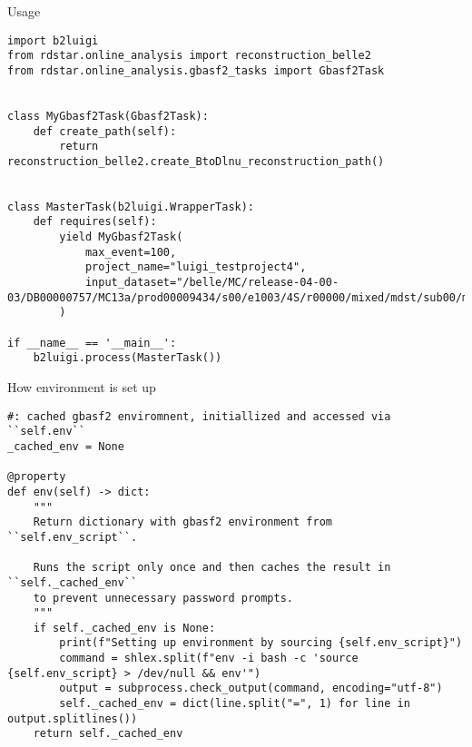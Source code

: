 \documentclass[aspectratio=169, 16pt]{beamer}
\begin{document}
\begin{frame}[label={sec:org00950e7},fragile]{Usage}
 \lstset{language=Python,label= ,caption= ,captionpos=b,numbers=none,basicstyle=\tiny\ttfamily, xleftmargin=-5pt}
\begin{lstlisting}
import b2luigi
from rdstar.online_analysis import reconstruction_belle2
from rdstar.online_analysis.gbasf2_tasks import Gbasf2Task


class MyGbasf2Task(Gbasf2Task):
    def create_path(self):
        return reconstruction_belle2.create_BtoDlnu_reconstruction_path()


class MasterTask(b2luigi.WrapperTask):
    def requires(self):
        yield MyGbasf2Task(
            max_event=100,
            project_name="luigi_testproject4",
            input_dataset="/belle/MC/release-04-00-03/DB00000757/MC13a/prod00009434/s00/e1003/4S/r00000/mixed/mdst/sub00/mdst_000255_prod00009434_task10020000255.root",
        )

if __name__ == '__main__':
    b2luigi.process(MasterTask())
\end{lstlisting}
\end{frame}
\begin{frame}[label={sec:orga73c833},fragile]{How environment is set up}
 \lstset{language=Python,label= ,caption= ,captionpos=b,numbers=none,basicstyle=\tiny\ttfamily, xleftmargin=-5pt}
\begin{lstlisting}
#: cached gbasf2 enviromnent, initiallized and accessed via ``self.env``
_cached_env = None

@property
def env(self) -> dict:
    """
    Return dictionary with gbasf2 environment from ``self.env_script``.

    Runs the script only once and then caches the result in ``self._cached_env``
    to prevent unnecessary password prompts.
    """
    if self._cached_env is None:
        print(f"Setting up environment by sourcing {self.env_script}")
        command = shlex.split(f"env -i bash -c 'source {self.env_script} > /dev/null && env'")
        output = subprocess.check_output(command, encoding="utf-8")
        self._cached_env = dict(line.split("=", 1) for line in output.splitlines())
    return self._cached_env
\end{lstlisting}
\end{frame}
\end{document}
